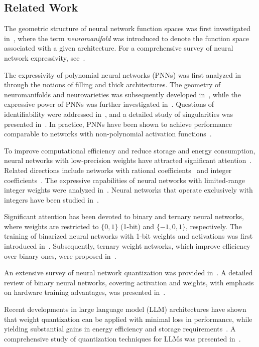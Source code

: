 \documentclass[a4paper]{cas-sc}
\begin{document}
\subsection{Related Work}
    The geometric structure of neural network function spaces was first investigated in~\citet{AMARI94}, where the term \textit{neuromanifold} was introduced to denote the function space associated with a given architecture. For a comprehensive survey of neural network expressivity, see~\citet{GUHRING20}.

    The expressivity of polynomial neural networks (PNNs) was first analyzed in~\citet{KILEEL19} through the notions of filling and thick architectures. The geometry of neuromanifolds and neurovarieties was subsequently developed in~\citet{KUBJAS24}, while the expressive power of PNNs was further investigated in~\citet{FINKEL25}. Questions of identifiability were addressed in~\citet{USEVICH25}, and a detailed study of singularities was presented in~\citet{SHAHVERDI25-1}. In practice, PNNs have been shown to achieve performance comparable to networks with non-polynomial activation functions~\citep{YAVARTANOO21, CHRYSOS22}. 
    
    To improve computational efficiency and reduce storage and energy consumption, neural networks with low-precision weights have attracted significant attention~\citep{COURBARIAUX14}. Related directions include networks with rational coefficients~\citep{AVERKOV25} and integer coefficients~\citep{WU18}. The expressive capabilities of neural networks with limited-range integer weights were analyzed in~\citet{DRAGHICI02}. Neural networks that operate exclusively with integers have been studied in~\citet{WANG22}.  
    
    Significant attention has been devoted to binary and ternary neural networks, where weights are restricted to $\{0,1\}$ (1-bit) and $\{-1,0,1\}$, respectively. The training of binarized neural networks with 1-bit weights and activations was first introduced in~\citet{HUBARA16}. Subsequently, ternary weight networks, which improve efficiency over binary ones, were proposed in~\citet{LIU23}.

    An extensive survey of neural network quantization was provided in~\citet{GHOLAMI22}. A detailed review of binary neural networks, covering activation and weights, with emphasis on hardware training advantages, was presented in~\citet{YUAN23}.

    Recent developments in large language model (LLM) architectures have shown that weight quantization can be applied with minimal loss in performance, while yielding substantial gains in energy efficiency and storage requirements~\citep{MA24}. A comprehensive study of quantization techniques for LLMs was presented in~\citet{RENREN24}.
\end{document}
